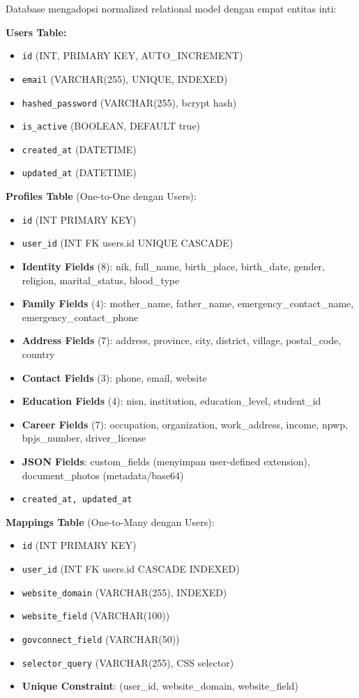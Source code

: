 \documentclass[12pt,a4paper]{article}
\begin{document}
Database mengadopsi normalized relational model dengan empat entitas inti:

\textbf{Users Table:}
\begin{itemize}
  \item \texttt{id} (INT, PRIMARY KEY, AUTO\_INCREMENT)
  \item \texttt{email} (VARCHAR(255), UNIQUE, INDEXED)
  \item \texttt{hashed\_password} (VARCHAR(255), bcrypt hash)
  \item \texttt{is\_active} (BOOLEAN, DEFAULT true)
  \item \texttt{created\_at} (DATETIME)
  \item \texttt{updated\_at} (DATETIME)
\end{itemize}

\textbf{Profiles Table} (One-to-One dengan Users):
\begin{itemize}
  \item \texttt{id} (INT PRIMARY KEY)
  \item \texttt{user\_id} (INT FK users.id UNIQUE CASCADE)
  \item \textbf{Identity Fields} (8): nik, full\_name, birth\_place, birth\_date, gender, religion, marital\_status, blood\_type
  \item \textbf{Family Fields} (4): mother\_name, father\_name, emergency\_contact\_name, emergency\_contact\_phone
  \item \textbf{Address Fields} (7): address, province, city, district, village, postal\_code, country
  \item \textbf{Contact Fields} (3): phone, email, website
  \item \textbf{Education Fields} (4): nisn, institution, education\_level, student\_id
  \item \textbf{Career Fields} (7): occupation, organization, work\_address, income, npwp, bpjs\_number, driver\_license
  \item \textbf{JSON Fields}: custom\_fields (menyimpan user-defined extension), document\_photos (metadata/base64)
  \item \texttt{created\_at, updated\_at}
\end{itemize}

\textbf{Mappings Table} (One-to-Many dengan Users):
\begin{itemize}
  \item \texttt{id} (INT PRIMARY KEY)
  \item \texttt{user\_id} (INT FK users.id CASCADE INDEXED)
  \item \texttt{website\_domain} (VARCHAR(255), INDEXED)
  \item \texttt{website\_field} (VARCHAR(100))
  \item \texttt{govconnect\_field} (VARCHAR(50))
  \item \texttt{selector\_query} (VARCHAR(255), CSS selector)
  \item \textbf{Unique Constraint}: (user\_id, website\_domain, website\_field)
\end{itemize}
\end{document}
